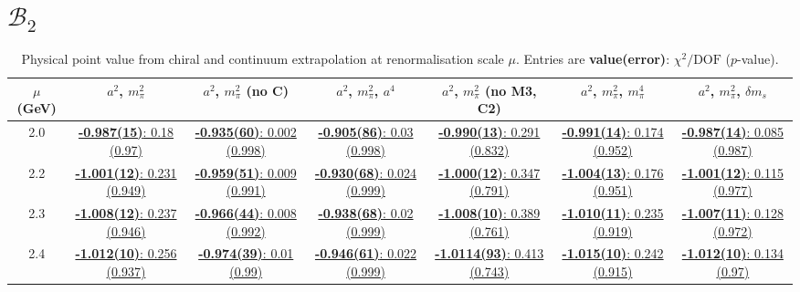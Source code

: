 \documentclass[12pt]{extarticle}
\begin{document}
\section{$\mathcal{B}_2$}
\begin{table}[h!]
\begin{center}
\begin{tabular}{|c|c|c|c|c|c|c|}
\hline
$\mu$ (GeV) & $a^2$, $m_\pi^2$& $a^2$, $m_\pi^2$ (no C)& $a^2$, $m_\pi^2$, $a^4$& $a^2$, $m_\pi^2$ (no M3, C2)& $a^2$, $m_\pi^2$, $m_\pi^4$& $a^2$, $m_\pi^2$, $\delta m_s$\\
\hline
2.0& \hyperlink{VVmAA/NPR/bag_a2m2_20.pdf.1}{\textbf{-0.987(15)}: 0.18 (0.97)} & \hyperlink{VVmAA/NPR/bag_a2m2noC_20.pdf.1}{\textbf{-0.935(60)}: 0.002 (0.998)} & \hyperlink{VVmAA/NPR/bag_a2a4m2_20.pdf.1}{\textbf{-0.905(86)}: 0.03 (0.998)} & \hyperlink{VVmAA/NPR/bag_a2m2mcut_20.pdf.1}{\textbf{-0.990(13)}: 0.291 (0.832)} & \hyperlink{VVmAA/NPR/bag_a2m2m4_20.pdf.1}{\textbf{-0.991(14)}: 0.174 (0.952)} & \hyperlink{VVmAA/NPR/bag_a2m2delm_20.pdf.1}{\textbf{-0.987(14)}: 0.085 (0.987)}\\
2.2& \hyperlink{VVmAA/NPR/bag_a2m2_22.pdf.1}{\textbf{-1.001(12)}: 0.231 (0.949)} & \hyperlink{VVmAA/NPR/bag_a2m2noC_22.pdf.1}{\textbf{-0.959(51)}: 0.009 (0.991)} & \hyperlink{VVmAA/NPR/bag_a2a4m2_22.pdf.1}{\textbf{-0.930(68)}: 0.024 (0.999)} & \hyperlink{VVmAA/NPR/bag_a2m2mcut_22.pdf.1}{\textbf{-1.000(12)}: 0.347 (0.791)} & \hyperlink{VVmAA/NPR/bag_a2m2m4_22.pdf.1}{\textbf{-1.004(13)}: 0.176 (0.951)} & \hyperlink{VVmAA/NPR/bag_a2m2delm_22.pdf.1}{\textbf{-1.001(12)}: 0.115 (0.977)}\\
2.3& \hyperlink{VVmAA/NPR/bag_a2m2_23.pdf.1}{\textbf{-1.008(12)}: 0.237 (0.946)} & \hyperlink{VVmAA/NPR/bag_a2m2noC_23.pdf.1}{\textbf{-0.966(44)}: 0.008 (0.992)} & \hyperlink{VVmAA/NPR/bag_a2a4m2_23.pdf.1}{\textbf{-0.938(68)}: 0.02 (0.999)} & \hyperlink{VVmAA/NPR/bag_a2m2mcut_23.pdf.1}{\textbf{-1.008(10)}: 0.389 (0.761)} & \hyperlink{VVmAA/NPR/bag_a2m2m4_23.pdf.1}{\textbf{-1.010(11)}: 0.235 (0.919)} & \hyperlink{VVmAA/NPR/bag_a2m2delm_23.pdf.1}{\textbf{-1.007(11)}: 0.128 (0.972)}\\
2.4& \hyperlink{VVmAA/NPR/bag_a2m2_24.pdf.1}{\textbf{-1.012(10)}: 0.256 (0.937)} & \hyperlink{VVmAA/NPR/bag_a2m2noC_24.pdf.1}{\textbf{-0.974(39)}: 0.01 (0.99)} & \hyperlink{VVmAA/NPR/bag_a2a4m2_24.pdf.1}{\textbf{-0.946(61)}: 0.022 (0.999)} & \hyperlink{VVmAA/NPR/bag_a2m2mcut_24.pdf.1}{\textbf{-1.0114(93)}: 0.413 (0.743)} & \hyperlink{VVmAA/NPR/bag_a2m2m4_24.pdf.1}{\textbf{-1.015(10)}: 0.242 (0.915)} & \hyperlink{VVmAA/NPR/bag_a2m2delm_24.pdf.1}{\textbf{-1.012(10)}: 0.134 (0.97)}\\
\hline
\end{tabular}
\caption{Physical point value from chiral and continuum extrapolation at renormalisation scale $\mu$. Entries are \textbf{value(error)}: $\chi^2/\text{DOF}$ ($p$-value).}
\end{center}
\end{table}
\end{document}
